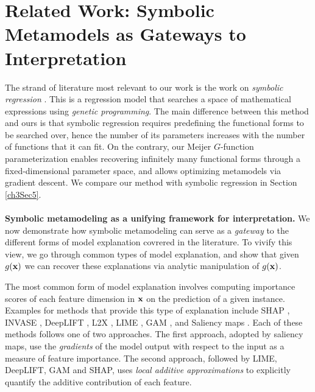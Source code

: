 \documentclass [PhD] {uclathes}
\begin{document}
\section{Related Work: Symbolic Metamodels as Gateways to Interpretation}
\label{ch3sec4}
The strand of literature most relevant to our work is the work on {\it symbolic regression} \cite{orzechowski2018we,menezes2014symbolic,vladislavleva2009order}. This is a regression model that searches a space of mathematical expressions using {\it genetic programming}. The main difference between this method and ours is that symbolic regression requires predefining the functional forms to be searched over, hence the number of its parameters increases with the number of functions that it can fit. On the contrary, our Meijer $G$-function parameterization enables recovering infinitely many functional forms through a fixed-dimensional parameter space, and allows optimizing metamodels via gradient descent. We compare our method with symbolic regression in Section \ref{ch3Sec5}. \\
\\
{\bf Symbolic metamodeling as a unifying framework for interpretation.} We now demonstrate how symbolic metamodeling can serve as a {\it gateway} to the different forms of model explanation covrered in the literature. To vivify this view, we go through common types of model explanation, and show that given $g({\bf x})$ we can recover these explanations via analytic manipulation of $g({\bf x})$. 

The most common form of model explanation involves computing importance scores of each feature dimension in ${\bf x}$ on the prediction of a given instance. Examples for methods that provide this type of explanation include SHAP \cite{lundberg2017unified}, INVASE \cite{yoon2018invase}, DeepLIFT \cite{shrikumar2017learning}, L2X \cite{chen2018learning}, LIME \cite{elenberg2017streaming,ribeiro2016should}, GAM \cite{hastie2017generalized}, and Saliency maps \cite{simonyan2013deep}. Each of these methods follows one of two approaches. The first approach, adopted by saliency maps, use the {\it gradients} of the model output with respect to the input as a measure of feature importance. The second approach, followed by LIME, DeepLIFT, GAM and SHAP, uses {\it local additive approximations} to explicitly quantify the additive contribution of each feature.
\end{document}
